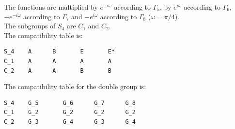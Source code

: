 \documentclass[12pt,a4paper]{article}
\begin{document}
The functions are multiplied by $e^{-i\omega}$ according to $\Gamma_5$,
by $e^{i\omega}$ according to $\Gamma_6$, $-e^{-i\omega}$ according to
$\Gamma_7$ and $-e^{i\omega}$ according to $\Gamma_8$ ($\omega=\pi/4$). \\
The subgroups of $S_4$ are $C_1$ and $C_2$. \\
The compatibility table is:
\begin{verbatim}
S_4    A      B       E       E*  
C_1    A      A       A       A
C_2    A      A       B       B
\end{verbatim}
The compatibility table for the double group is:
\begin{verbatim}
S_4    G_5       G_6      G_7      G_8 
C_1    G_2       G_2      G_2      G_2
C_2    G_3       G_4      G_3      G_4
\end{verbatim}
\end{document}
